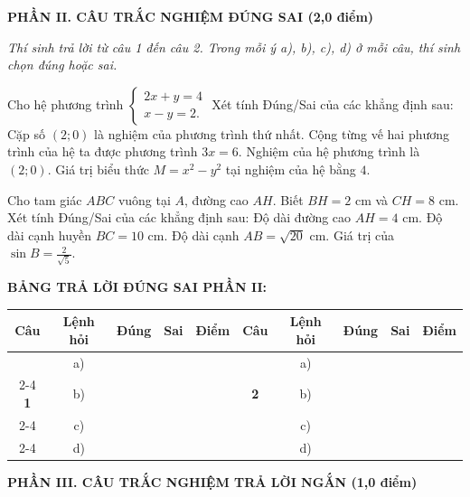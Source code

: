 \documentclass[12pt,a4paper]{article}
\begin{document}
\noindent\textbf{\large PHẦN II. CÂU TRẮC NGHIỆM ĐÚNG SAI (2,0 điểm)}

\textit{Thí sinh trả lời từ câu 1 đến câu 2. Trong mỗi ý a), b), c), d) ở mỗi câu, thí sinh chọn đúng hoặc sai.}

\vspace{1mm}
\begin{ex}
Cho hệ phương trình $\begin{cases} 2x + y = 4 \\ x - y = 2. \end{cases}$ Xét tính Đúng/Sai của các khẳng định sau:
\choiceTF
{\True Cặp số $(2; 0)$ là nghiệm của phương trình thứ nhất.}
{\True Cộng từng vế hai phương trình của hệ ta được phương trình $3x = 6$.}
{\True Nghiệm của hệ phương trình là $(2; 0)$.}
{\True Giá trị biểu thức $M = x^2 - y^2$ tại nghiệm của hệ bằng $4$.}
\end{ex}

\begin{ex}
Cho tam giác $ABC$ vuông tại $A$, đường cao $AH$. Biết $BH = 2\text{ cm}$ và $CH = 8\text{ cm}$. Xét tính Đúng/Sai của các khẳng định sau:
\choiceTF
{\True Độ dài đường cao $AH = 4\text{ cm}$.}
{\True Độ dài cạnh huyền $BC = 10\text{ cm}$.}
{\True Độ dài cạnh $AB = \sqrt{20}\text{ cm}$.}
{\True Giá trị của $\sin B = \frac{2}{\sqrt{5}}$.}
\end{ex}


\vspace{1mm}
\noindent\textbf{BẢNG TRẢ LỜI ĐÚNG SAI PHẦN II:}
\begin{center}
\begin{tabular}{|c|c|c|c|c||c|c|c|c|c|}
\hline
\textbf{Câu} & \textbf{Lệnh hỏi} & \textbf{Đúng} & \textbf{Sai} & \textbf{Điểm} & \textbf{Câu} & \textbf{Lệnh hỏi} & \textbf{Đúng} & \textbf{Sai} & \textbf{Điểm} \\
\hline
 & a) & & & & & a) & & & \\
\cline{2-4}\cline{7-9}
\textbf{1} & b) & & & & \textbf{2} & b) & & & \\
\cline{2-4}\cline{7-9}
 & c) & & & & & c) & & & \\
\cline{2-4}\cline{7-9}
 & d) & & & & & d) & & & \\
\hline
\end{tabular}
\end{center}
\vspace{2mm}

\noindent\textbf{\large PHẦN III. CÂU TRẮC NGHIỆM TRẢ LỜI NGẮN (1,0 điểm)}
\end{document}
